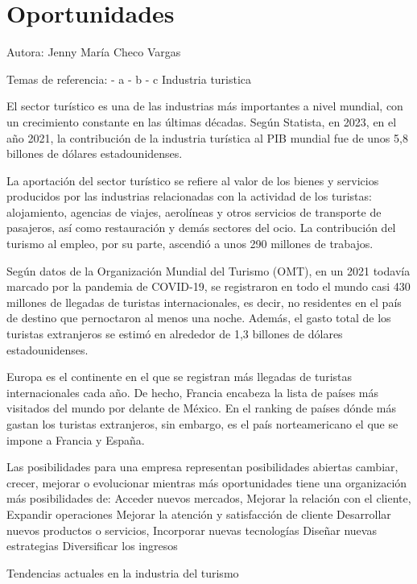 \documentclass[
  letterpaper,
  DIV=11,
  numbers=noendperiod]{scrreprt}
\begin{document}

\hypertarget{oportunidades}{%
\chapter{Oportunidades}\label{oportunidades}}

Autora: Jenny María Checo Vargas

Temas de referencia: - a - b - c Industria turistica

El sector turístico es una de las industrias más importantes a nivel
mundial, con un crecimiento constante en las últimas décadas. Según
Statista, en 2023, en el año 2021, la contribución de la industria
turística al PIB mundial fue de unos 5,8 billones de dólares
estadounidenses.

La aportación del sector turístico se refiere al valor de los bienes y
servicios producidos por las industrias relacionadas con la actividad de
los turistas: alojamiento, agencias de viajes, aerolíneas y otros
servicios de transporte de pasajeros, así como restauración y demás
sectores del ocio. La contribución del turismo al empleo, por su parte,
ascendió a unos 290 millones de trabajos.

Según datos de la Organización Mundial del Turismo (OMT), en un 2021
todavía marcado por la pandemia de COVID-19, se registraron en todo el
mundo casi 430 millones de llegadas de turistas internacionales, es
decir, no residentes en el país de destino que pernoctaron al menos una
noche. Además, el gasto total de los turistas extranjeros se estimó en
alrededor de 1,3 billones de dólares estadounidenses.

Europa es el continente en el que se registran más llegadas de turistas
internacionales cada año. De hecho, Francia encabeza la lista de países
más visitados del mundo por delante de México. En el ranking de países
dónde más gastan los turistas extranjeros, sin embargo, es el país
norteamericano el que se impone a Francia y España.

Las posibilidades para una empresa representan posibilidades abiertas
cambiar, crecer, mejorar o evolucionar mientras más oportunidades tiene
una organización más posibilidades de: Acceder nuevos mercados, Mejorar
la relación con el cliente, Expandir operaciones Mejorar la atención y
satisfacción de cliente Desarrollar nuevos productos o servicios,
Incorporar nuevas tecnologías Diseñar nuevas estrategias Diversificar
los ingresos

Tendencias actuales en la industria del turismo
\end{document}
